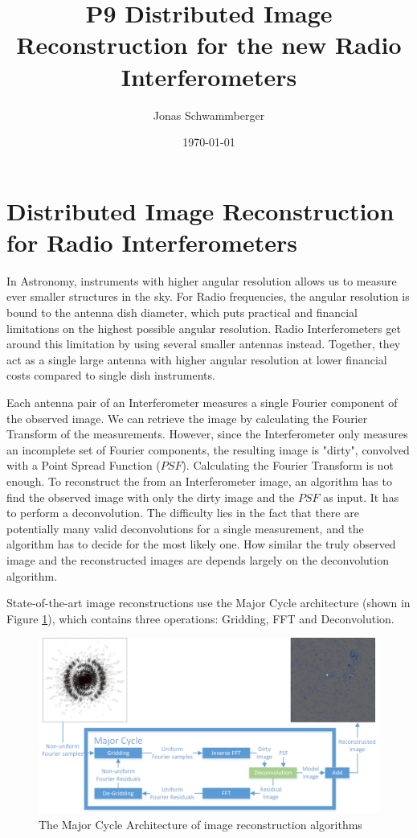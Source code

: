 \documentclass[11pt]{article}
\numberwithin{equation}{section}
\begin{document}
\title{P9 Distributed Image Reconstruction for the new Radio Interferometers}
\author{Jonas Schwammberger}
\date{\today}

\section*{Distributed Image Reconstruction for Radio Interferometers}
In Astronomy, instruments with higher angular resolution allows us to measure ever smaller structures in the sky. For Radio frequencies, the angular resolution is bound to the antenna dish diameter, which puts practical and financial limitations on the highest possible angular resolution. Radio Interferometers get around this limitation by using several smaller antennas instead. Together, they act as a single large antenna with higher angular resolution at lower financial costs compared to single dish instruments.

Each antenna pair of an Interferometer measures a single Fourier component of the observed image. We can retrieve the image by calculating the Fourier Transform of the measurements. However, since the Interferometer only measures an incomplete set of Fourier components, the resulting image is "dirty", convolved with a Point Spread Function ($PSF$). Calculating the Fourier Transform is not enough. To reconstruct the from an Interferometer image, an algorithm has to find the observed image with only the dirty image and the $PSF$ as input. It has to perform a deconvolution. The difficulty lies in the fact that there are potentially many valid deconvolutions for a single measurement, and the algorithm has to decide for the most likely one. How similar the truly observed image and the reconstructed images are depends largely on the deconvolution algorithm.

State-of-the-art image reconstructions use the Major Cycle architecture (shown in Figure \ref{hypo:major3}), which contains three operations: Gridding, FFT and Deconvolution.

\begin{figure}[h]
	\centering
	\includegraphics[width=0.80\linewidth]{./Major-Minor3.png}
	\caption{The Major Cycle Architecture of image reconstruction algorithms}
	\label{hypo:major3}
\end{figure}
\end{document}
